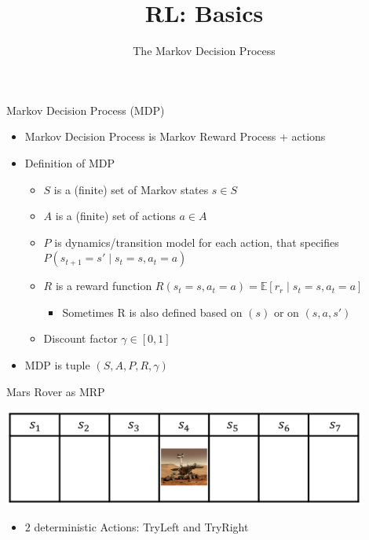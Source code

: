 


\title[Reinforcement Learning: Basics]{RL: Basics}
\subtitle{The Markov Decision Process}




	
	\maketitle

\begin{frame}[c]{Markov Decision Process (MDP)}

\begin{itemize}
	\item Markov Decision Process is Markov Reward Process + actions
	\item Definition of MDP
	\begin{itemize}
		\item $S$ is a (finite) set of Markov states $s \in S$
		\item $A$ is a (finite) set of actions $a \in A$
		\item $P$ is dynamics/transition model for each action, that specifies $P(s_{t+1} = s' \mid s_t=s, a_t=a)$
		\item $R$ is a reward function 
		$R(s_t=s, a_t=a) = \mathbb{E}[r_r \mid s_t=s, a_t=a] $
		\begin{itemize}
			\item Sometimes R is also defined based on $(s)$ or on $(s,a,s')$
		\end{itemize}
		\item Discount factor $\gamma \in [0, 1]$
	\end{itemize}
	\item MDP is tuple $(S,A,P, R, \gamma)$
\end{itemize}

\end{frame}
\begin{frame}[c]{Mars Rover as MRP}

\begin{center}
	\includegraphics[width=0.9\textwidth]{images/mars_rover.png}
\end{center}

\begin{itemize}
	\item $2$ deterministic Actions: TryLeft and TryRight
\end{itemize}



\end{frame}
